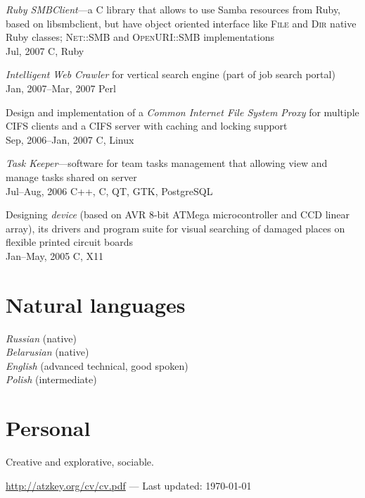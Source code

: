 \documentclass[12pt, a4paper]{article}
\newcommand{\years}[2]{\marginpar{\scriptsize #1 #2}}
\begin{document}
\begin{list}{}{\leftmargin=0pt}
	\item \textit{Ruby SMBClient}---a C library that allows to use Samba resources from Ruby, based on
	libsmbclient, but have object oriented interface like \textsc{File} and \textsc{Dir} native Ruby classes;
	\textsc{Net::SMB} and \textsc{OpenURI::SMB} implementations\\
	Jul, 2007 \hfill C, Ruby

	\item \textit{Intelligent Web Crawler} for vertical search engine (part of job search
	portal)\\
	Jan, 2007--Mar, 2007 \hfill Perl

	\item Design and implementation of a \textit{Common Internet File System Proxy}
	for multiple CIFS clients and a CIFS server with caching and locking
	support\\
	Sep, 2006--Jan, 2007 \hfill C, Linux

	\item \textit{Task Keeper}---software for team tasks management that allowing view and
	manage tasks shared on server\\
	Jul--Aug, 2006 \hfill C++, C, QT, GTK, PostgreSQL

	\item Designing \textit{device} \years{2005}{University project} (based on AVR 8-bit ATMega microcontroller and CCD
	linear array), its drivers and program suite for visual searching of damaged
	places on flexible printed circuit boards\\
	Jan--May, 2005 \hfill C, X11
\end{list}

\section*{Natural languages}
\textit{Russian} (native)\\
\textit{Belarusian} (native)\\
\textit{English} (advanced technical, good spoken)\\
\textit{Polish} (intermediate)

\section*{Personal}
Creative and explorative, sociable.

\vfill{}
\hrulefill
\begin{center}
\footnotesize \href{http://atzkey.org/cv/cv.pdf}{http://atzkey.org/cv/cv.pdf} — Last updated: \today
\end{center}
\end{document}
